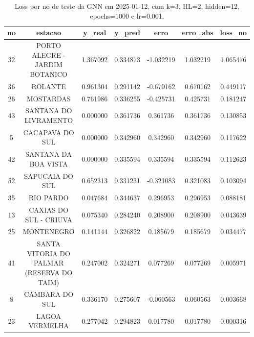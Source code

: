\begin{table}[h]
\centering
\caption{Loss por no de teste da GNN em 2025-01-12, com k=3, HL=2, hidden=12, epochs=1000 e lr=0.001.}
\label{tab:gnn_loss_k3_hl2_h12_e1000_d20250112}
\begin{tabular}{ccccccc}
\toprule
no & estacao & y\_real & y\_pred & erro & erro\_abs & loss\_no \\
\midrule
32 & PORTO ALEGRE - JARDIM BOTANICO & 1.367092 & 0.334873 & -1.032219 & 1.032219 & 1.065476 \\
36 & ROLANTE & 0.961304 & 0.291142 & -0.670162 & 0.670162 & 0.449117 \\
26 & MOSTARDAS & 0.761986 & 0.336255 & -0.425731 & 0.425731 & 0.181247 \\
43 & SANTANA DO LIVRAMENTO & 0.000000 & 0.361736 & 0.361736 & 0.361736 & 0.130853 \\
5 & CACAPAVA DO SUL & 0.000000 & 0.342960 & 0.342960 & 0.342960 & 0.117622 \\
42 & SANTANA DA BOA VISTA & 0.000000 & 0.335594 & 0.335594 & 0.335594 & 0.112623 \\
52 & SAPUCAIA DO SUL & 0.652313 & 0.331231 & -0.321083 & 0.321083 & 0.103094 \\
35 & RIO PARDO & 0.047684 & 0.344637 & 0.296953 & 0.296953 & 0.088181 \\
13 & CAXIAS DO SUL - CRIUVA & 0.075340 & 0.284240 & 0.208900 & 0.208900 & 0.043639 \\
25 & MONTENEGRO & 0.141144 & 0.326822 & 0.185679 & 0.185679 & 0.034477 \\
41 & SANTA VITORIA DO PALMAR (RESERVA DO TAIM) & 0.247002 & 0.324271 & 0.077269 & 0.077269 & 0.005971 \\
8 & CAMBARA DO SUL & 0.336170 & 0.275607 & -0.060563 & 0.060563 & 0.003668 \\
23 & LAGOA VERMELHA & 0.277042 & 0.294823 & 0.017780 & 0.017780 & 0.000316 \\
\bottomrule
\end{tabular}
\end{table}
